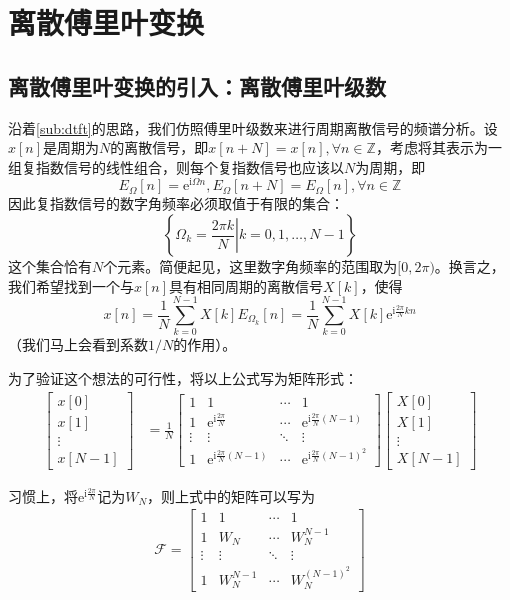 \section{离散傅里叶变换}\label{sec:DFT}

\subsection{离散傅里叶变换的引入：离散傅里叶级数}\label{sub:intro_DFT}

沿着\ref{sub:dtft}的思路，我们仿照傅里叶级数来进行周期离散信号的频谱分析。设$x[n]$是周期为$N$的离散信号，即$x[n+N]=x[n],\forall n\in\mathbb{Z}$，考虑将其表示为一组复指数信号的线性组合，则每个复指数信号也应该以$N$为周期，即
\[E_{\Omega}[n]=\mathrm{e}^{\mathrm{i}\Omega n},E_{\Omega}[n+N]=E_{\Omega}[n],\forall n\in\mathbb{Z}\]
因此复指数信号的数字角频率必须取值于有限的集合：
\[\left\{\left.\Omega_k=\frac{2\pi k}{N}\right|k=0,1,\dots,N-1\right\}\]
这个集合恰有$N$个元素。简便起见，这里数字角频率的范围取为$[0,2\pi)$。换言之，我们希望找到一个与$x[n]$具有相同周期的离散信号$X[k]$，使得
\[x[n]=\frac{1}{N}\sum_{k=0}^{N-1}X[k]E_{\Omega_k}[n]=\frac{1}{N}\sum_{k=0}^{N-1}X[k]\mathrm{e}^{\mathrm{i}\frac{2\pi}{N}kn}\]
（我们马上会看到系数$1/N$的作用）。

为了验证这个想法的可行性，将以上公式写为矩阵形式：
\begin{align*}
\begin{bmatrix}x[0]  \\
x[1]  \\
\vdots \\
x[N-1]
\end{bmatrix}&=\frac{1}{N}\begin{bmatrix}1 & 1 & \cdots & 1 \\
1 & \mathrm{e}^{\mathrm{i}\frac{2\pi}{N}} & \cdots & \mathrm{e}^{\mathrm{i}\frac{2\pi}{N}(N-1)} \\
\vdots & \vdots & \ddots & \vdots \\
1 & \mathrm{e}^{\mathrm{i}\frac{2\pi}{N}(N-1)} & \cdots & \mathrm{e}^{\mathrm{i}\frac{2\pi}{N}(N-1)^2}
\end{bmatrix}\begin{bmatrix}X[0]  \\
X[1]  \\
\vdots \\
X[N-1]
\end{bmatrix}
\end{align*}

习惯上，将$\mathrm{e}^{\mathrm{i}\frac{2\pi}{N}}$记为$W_N$，则上式中的矩阵可以写为
\begin{align*}
    \mathcal{F} =\begin{bmatrix}1 & 1 & \cdots & 1 \\
        1 & W_N & \cdots & W_N^{N-1} \\
        \vdots & \vdots & \ddots & \vdots \\
        1 & W_N^{N-1} & \cdots & W_N^{(N-1)^2}
    \end{bmatrix}
\end{align*}

